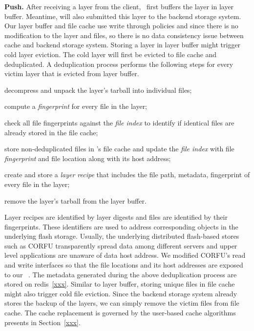 \textbf{Push.}
After receiving a layer from the client, 
\sysname~first buffers the layer in layer buffer. 
Meantime, \sysname will also submitted this layer to the backend storage system.
Our layer buffer and file cache use write through policies 
and since there is no modification to the layer and files, so there is no data consistency issue between
cache and backend storage system.
Storing a layer in layer buffer might trigger cold layer eviction.
The cold layer will first be evicted to file cache and deduplicated.
A deduplication process performs the following steps for every victim layer that is evicted from layer buffer.
\begin{compactenumerate}
	\item decompress and unpack the layer's tarball into individual files;
	\item compute a \emph{fingerprint} for every file in the layer;
	\item check all file fingerprints against the \emph{file index} to
	identify if identical files are already stored in the file cache;
	\item store non-deduplicated files in \sysname's file cache and update the 
	\emph{file index} with file \emph{fingerprint} and file location along with its host address;
	\item create and store a \emph{layer recipe} that includes the file path,
	metadata, fingerprint of every file in the layer;
	\item remove the layer's tarball from the layer buffer.
\end{compactenumerate}
Layer recipes are identified by layer digests and files are identified by their fingerprints.
%
These identifiers are used to address corresponding objects in the
underlying flash storage.
Usually, the underlying distributed flash-based stores such as CORFU transparently spread data among
different servers and upper level applications are unaware of data host address. 
We modified CORFU's read and write interfaces so that the file locations and 
its host addresses are exposed to our ~\sysname.
 The metadata generated during the above deduplication process
 are stored on redis~\ref{xxx}.
 Similar to layer buffer, storing unique files in file cache might also trigger cold file eviction.
 Since the backend storage system already stores the backup of the layers, we can simply remove
 the victim files from file cache.
 The cache replacement is governed by the user-based cache algorithms
presents in Section~\ref{xxx}. 
